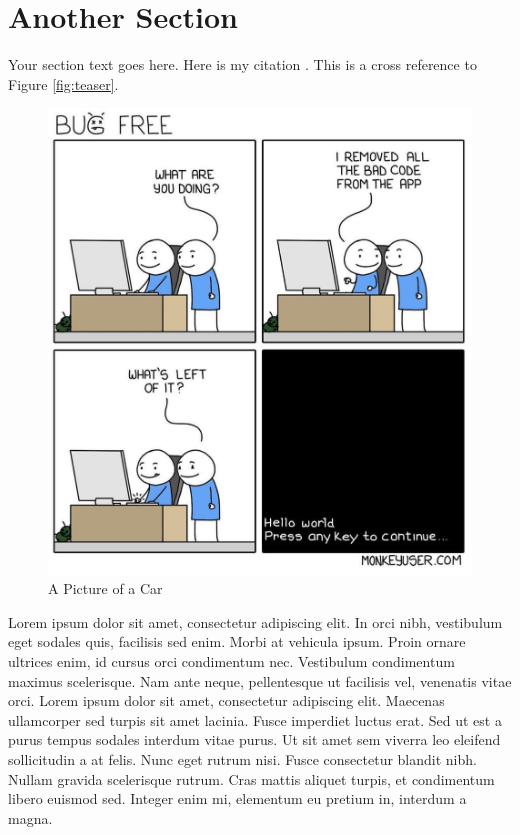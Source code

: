 \section{Another Section}

Your section text goes here. Here is my citation \cite{ekkel2017nearby}. This is a cross reference to Figure \ref{fig:teaser}.

\begin{figure}[h]
\includegraphics[width=\columnwidth]{images/code_all_gone.jpg}
\caption{A Picture of a Car}
\end{figure}

Lorem ipsum dolor sit amet, consectetur adipiscing elit. In orci nibh, vestibulum eget sodales quis, facilisis sed enim. Morbi at vehicula ipsum. Proin ornare ultrices enim, id cursus orci condimentum nec. Vestibulum condimentum maximus scelerisque. Nam ante neque, pellentesque ut facilisis vel, venenatis vitae orci. Lorem ipsum dolor sit amet, consectetur adipiscing elit. Maecenas ullamcorper sed turpis sit amet lacinia. Fusce imperdiet luctus erat. Sed ut est a purus tempus sodales interdum vitae purus. Ut sit amet sem viverra leo eleifend sollicitudin a at felis. Nunc eget rutrum nisi. Fusce consectetur blandit nibh. Nullam gravida scelerisque rutrum. Cras mattis aliquet turpis, et condimentum libero euismod sed. Integer enim mi, elementum eu pretium in, interdum a magna.

